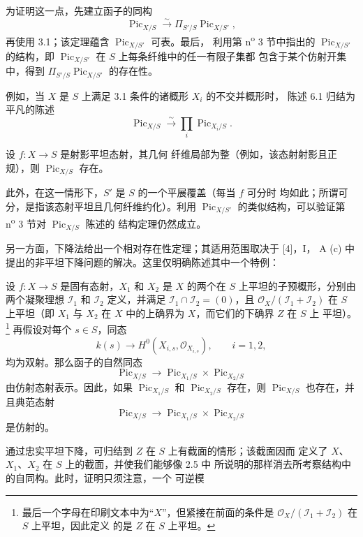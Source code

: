 为证明这一点，先建立函子的同构
\[
\operatorname{Pic}_{X/S}\xrightarrow{\sim}
\Pi_{S'/S}\operatorname{Pic}_{X/S'},
\]
再使用 3.1；该定理蕴含 $\operatorname{Pic}_{X/S'}$ 可表。最后，
利用第 n\textsuperscript{o} 3 节中指出的
$\operatorname{Pic}_{X/S'}$ 的结构，即
$\operatorname{Pic}_{X/S'}$ 在 $S$ 上每条纤维中的任一有限子集都
包含于某个仿射开集中，得到
$\Pi_{S'/S}\operatorname{Pic}_{X/S'}$ 的存在性。

例如，当 $X$ 是 $S$ 上满足 3.1 条件的诸概形 $X_i$ 的不交并概形时，
陈述 6.1 归结为平凡的陈述
\[
\operatorname{Pic}_{X/S}\xrightarrow{\sim}
\prod_i\operatorname{Pic}_{X_i/S}.
\]

 设 $f:X\longrightarrow S$ 是射影平坦态射，其几何
纤维局部为整（例如，该态射射影且正规），则
$\operatorname{Pic}_{X/S}$ 存在。

此外，在这一情形下，$S'$ 是 $S$ 的一个平展覆盖（每当 $f$ 可分时
均如此；所谓可分，是指该态射平坦且几何纤维约化）。利用
$\operatorname{Pic}_{X/S'}$ 的类似结构，可以验证第
n\textsuperscript{o} 3 节对 $\operatorname{Pic}_{X/S}$ 陈述的
结构定理仍然成立。

另一方面，下降法给出一个相对存在性定理；其适用范围取决于 [4]，I，
A (c) 中提出的非平坦下降问题的解决。这里仅明确陈述其中一个特例：

 设 $f:X\longrightarrow S$ 是固有态射，$X_1$ 和
$X_2$ 是 $X$ 的两个在 $S$ 上平坦的子预概形，分别由两个凝聚理想
$\mathcal I_1$ 和 $\mathcal I_2$ 定义，并满足
$\mathcal I_1\cap\mathcal I_2=(0)$，且
$\mathcal O_X/(\mathcal I_1+\mathcal I_2)$ 在 $S$ 上平坦（即 $X_1$
与 $X_2$ 在 $X$ 中的上确界为 $X$，而它们的下确界 $Z$ 在 $S$ 上
平坦）。
\footnote{最后一个字母在印刷文本中为“$X$”，但紧接在前面的条件是
$\mathcal O_X/(\mathcal I_1+\mathcal I_2)$ 在 $S$ 上平坦，因此定义
的是 $Z$ 在 $S$ 上平坦。}
再假设对每个 $s\in S$，同态
\[
k(s)\longrightarrow H^0(X_{i,s},\mathcal O_{X_{i,s}}),\qquad i=1,2,
\]
均为双射。那么函子的自然同态
\[
\operatorname{Pic}_{X/S}\longrightarrow
\operatorname{Pic}_{X_1/S}\times\operatorname{Pic}_{X_2/S}
\]
由仿射态射表示。因此，如果 $\operatorname{Pic}_{X_1/S}$ 和
$\operatorname{Pic}_{X_2/S}$ 存在，则 $\operatorname{Pic}_{X/S}$
也存在，并且典范态射
\[
\operatorname{Pic}_{X/S}\longrightarrow
\operatorname{Pic}_{X_1/S}\times\operatorname{Pic}_{X_2/S}
\]
是仿射的。

通过忠实平坦下降，可归结到 $Z$ 在 $S$ 上有截面的情形；该截面因而
定义了 $X$、$X_1$、$X_2$ 在 $S$ 上的截面，并使我们能够像 2.5 中
所说明的那样消去所考察结构中的自同构。此时，证明只须注意，一个
可逆模

